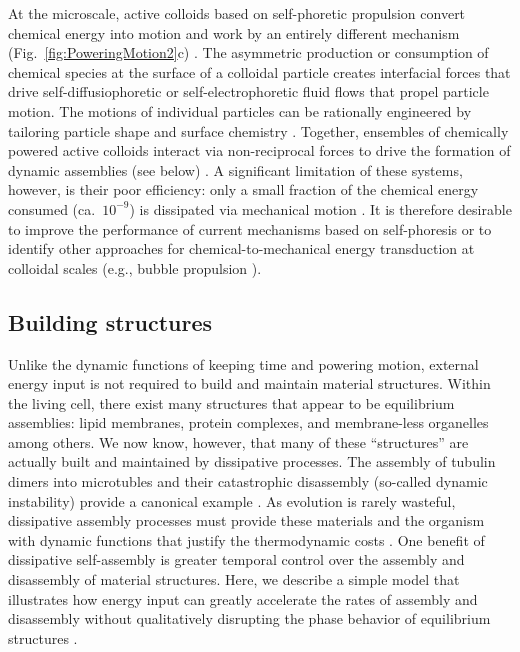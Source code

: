 \begin{appendices}
At the microscale, active colloids based on self-phoretic propulsion convert chemical energy into motion and work by an entirely different mechanism (Fig.~\ref{fig:PoweringMotion2}c) . The asymmetric production or consumption of chemical species at the surface of a colloidal particle creates interfacial forces that drive self-diffusiophoretic or self-electrophoretic fluid flows that propel particle motion.  The motions of individual particles can be rationally engineered by tailoring particle shape and surface chemistry \autocite{Brooks2018shape}.  Together, ensembles of chemically powered active colloids interact via non-reciprocal forces to drive the formation of dynamic assemblies (see below) \autocite{wang2015one, Lowen2018}.  A significant limitation of these systems, however, is their poor efficiency: only a small fraction of the chemical energy consumed (ca.~$10^{-9}$) is dissipated via mechanical motion \autocite{wang2013understanding}. It is therefore desirable to improve the performance of current mechanisms based on self-phoresis or to identify other approaches for chemical-to-mechanical energy transduction at colloidal scales (e.g., bubble propulsion \autocite{li2016rocket}). 

\subsection{Building structures}

Unlike the dynamic functions of keeping time and powering motion, external energy input is not required to build and maintain material structures.  Within the living cell, there exist many structures that appear to be equilibrium assemblies: lipid membranes, protein complexes, and membrane-less organelles among others.  We now know, however, that many of these ``structures'' are actually built and maintained by dissipative processes.  The assembly of tubulin dimers into microtubles and their catastrophic disassembly (so-called dynamic instability) provide a canonical example \autocite{Desai1997}. As evolution is rarely wasteful, dissipative assembly processes must provide these materials and the organism with dynamic functions that justify the thermodynamic costs \autocite{Ragazzon2018}. One benefit of dissipative self-assembly \autocite{De2018} is greater temporal control over the assembly and disassembly of material structures.  Here, we describe a simple model that illustrates how energy input can greatly accelerate the rates of assembly and disassembly without qualitatively disrupting the phase behavior of equilibrium structures \autocite{marsland2018active}. 


\end{appendices}

